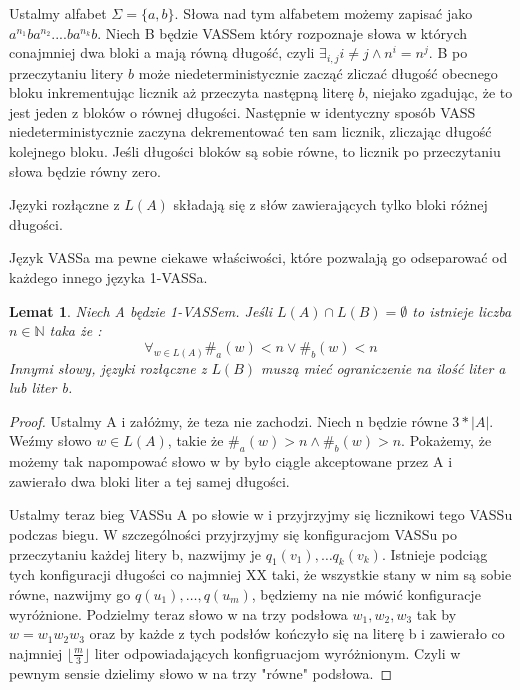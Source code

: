 \documentclass[magisterska]{pracamgr}
\newtheorem{lemma}[theorem]{Lemat}
\newtheorem{proof}[theorem]{Dowód}
\begin{document}
    \begin{example}
        Ustalmy alfabet $\Sigma=\{a,b\}$.
        Słowa nad tym alfabetem możemy zapisać jako $a^{n_1}ba^{n_2}....ba^{n_k}b$.
        Niech B będzie VASSem który rozpoznaje słowa w których conajmniej dwa bloki a mają równą długość, czyli $\exists_{i,j} i \neq j \land n^i = n^j$.
        B po przeczytaniu litery $b$ może niedeterministycznie zacząć zliczać długość obecnego bloku
        inkrementując licznik aż przeczyta następną literę $b$, niejako zgadując, że to jest jeden z bloków o równej długości.
        Następnie w identyczny sposób VASS niedeterministycznie zaczyna dekrementować ten sam licznik, zliczając długość kolejnego bloku.
        Jeśli długości bloków są sobie równe, to licznik po przeczytaniu słowa będzie równy zero.

        Języki rozłączne z $L(A)$ składają się z słów zawierających tylko bloki różnej długości.

        Język VASSa ma pewne ciekawe właściwości, które pozwalają go odseparować od każdego innego języka 1-VASSa.
        \begin{lemma}
            Niech A będzie 1-VASSem.
            Jeśli $L(A) \cap L(B)  = \emptyset$ to istnieje liczba $n \in \mathbb{N}$ taka że :
            \[\forall_{w \in L(A)} \#_a(w) <n \lor \#_b(w) <n\]
            Innymi słowy, języki rozłączne z $L(B)$ muszą mieć ograniczenie na ilość liter a lub liter b.
        \end{lemma}

        \begin{proof}
            Ustalmy A i załóżmy, że teza nie zachodzi.
            Niech n będzie równe $3*|A|$.
            Weźmy słowo $w \in L(A)$, takie że $\#_a(w) >n \land \#_b(w) >n$.
            Pokażemy, że możemy tak napompować słowo w by było ciągle akceptowane przez A i zawierało dwa bloki liter a tej samej długości.


            Ustalmy teraz bieg VASSu A po słowie w i przyjrzyjmy się licznikowi tego VASSu podczas biegu.
            W szczególności przyjrzyjmy się konfiguracjom VASSu po przeczytaniu każdej litery b,
            nazwijmy je $q_1(v_1), \dots q_k(v_k)$.
            Istnieje podciąg tych konfiguracji długości co najmniej XX taki, że wszystkie stany w nim są sobie równe, nazwijmy go
            $q(u_1), \dots ,q(u_m)$, będziemy na nie mówić konfiguracje wyróżnione.
            Podzielmy teraz słowo w na trzy podsłowa $w_1,w_2,w_3$ tak by $w=w_1 w_2 w_3$ oraz
            by każde z tych podsłów kończyło się na literę b i zawierało co najmniej $\lfloor\frac{m}{3} \rfloor$ liter odpowiadających konfigruacjom
            wyróżnionym.
            Czyli w pewnym sensie dzielimy słowo w na trzy "równe" podsłowa.


\end{proof}
\end{example}
\end{document}
